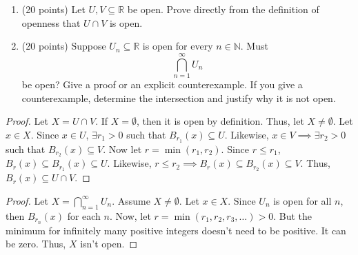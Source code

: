 \documentclass[11pt]{article}
\begin{document}
\begin{enumerate}[label=(\alph*)]
    \item (20 points) Let $U, V \subseteq \mathbb{R}$ be open. Prove directly from the definition of openness that $U \cap V$ is open.
    \item (20 points) Suppose $U_n \subseteq \mathbb{R}$ is open for every $n \in \mathbb{N}$. Must
    \[
    \bigcap_{n=1}^{\infty} U_n
    \]
    be open? Give a proof or an explicit counterexample. If you give a counterexample, determine the intersection and justify why it is not open.
\end{enumerate}
\begin{proof}
    Let $X = U \cap V$. If $X = \emptyset$, then it is open by definition. Thus, let $X \neq \emptyset$. Let $x \in X$. Since $x \in U$, $\exists r_1 > 0$ such that $B_{r_1}(x) \subseteq U$. Likewise, $x \in V \implies \exists r_2>0$ such that $B_{r_2}(x) \subseteq V$. Now let $r = \min(r_1,r_2)$.  Since $r \leq r_1$, $B_r(x) \subseteq B_{r_1}(x) \subseteq U$. Likewise, $r \leq r_2 \implies B_r(x) \subseteq B_{r_2}(x) \subseteq V$. Thus, $B_r(x) \subseteq U \cap V$.
\end{proof}
\begin{proof}
    Let $X = \bigcap_{n=1}^{\infty} U_n$. Assume $X \neq \emptyset$. Let $x \in X$. Since $U_n$ is open for all $n$, then $B_{r_n}(x)$ for each $n$. Now, let $r=\min(r_1,r_2,r_3,\ldots) > 0$. But the minimum for infinitely many positive integers doesn't need to be positive. It can be zero. Thus, $X$ isn't open. 
\end{proof}
\end{document}
